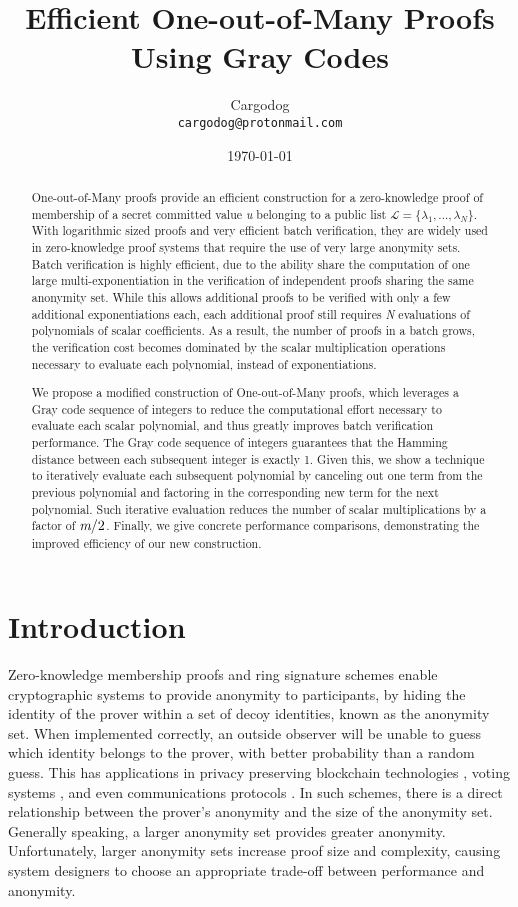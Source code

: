\documentclass{article}
\title{Efficient One-out-of-Many Proofs Using Gray Codes}
\author{Cargodog \\ \texttt{cargodog@protonmail.com}}
\date{\today}
\begin{document}
\maketitle


\begin{abstract}
One-out-of-Many proofs provide an efficient construction for a zero-knowledge proof of membership of a secret committed value \emph{u} belonging to a public list $\mathcal{L} = \{\lambda_1, ... , \lambda_N\}$. With logarithmic sized proofs and very efficient batch verification, they are widely used in zero-knowledge proof systems that require the use of very large anonymity sets. Batch verification is highly efficient, due to the ability share the computation of one large multi-exponentiation in the verification of independent proofs sharing the same anonymity set. While this allows additional proofs to be verified with only a few additional exponentiations each, each additional proof still requires \emph{N} evaluations of polynomials of scalar coefficients. As a result, the number of proofs in a batch grows, the verification cost becomes dominated by the scalar multiplication operations necessary to evaluate each polynomial, instead of exponentiations.

We propose a modified construction of One-out-of-Many proofs, which leverages a Gray code sequence of integers to reduce the computational effort necessary to evaluate each scalar polynomial, and thus greatly improves batch verification performance. The Gray code sequence of integers guarantees that the Hamming distance between each subsequent integer is exactly 1. Given this, we show a technique to iteratively evaluate each subsequent polynomial by canceling out one term from the previous polynomial and factoring in the corresponding new term for the next polynomial. Such iterative evaluation reduces the number of scalar multiplications by a factor of $\emph{m}/2$. Finally, we give concrete performance comparisons, demonstrating the improved efficiency of our new construction.
\end{abstract}

\section{Introduction}
Zero-knowledge membership proofs and ring signature schemes enable cryptographic systems to provide anonymity to participants, by hiding the identity of the prover within a set of decoy identities, known as the anonymity set. When implemented correctly, an outside observer will be unable to guess which identity belongs to the prover, with better probability than a random guess. This has applications in privacy preserving blockchain technologies \cite{ringct}\cite{lelantus}, voting systems \cite{fujisaki}, and even communications protocols \cite{Borisov}. In such schemes, there is a direct relationship between the prover's anonymity and the size of the anonymity set. Generally speaking, a larger anonymity set provides greater anonymity. Unfortunately, larger anonymity sets increase proof size and complexity, causing system designers to choose an appropriate trade-off between performance and anonymity.
\end{document}
